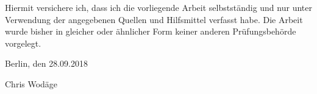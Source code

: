 
Hiermit versichere ich, dass ich die vorliegende Arbeit selbstständig und nur unter
Verwendung der angegebenen Quellen und Hilfsmittel verfasst habe. Die Arbeit wurde bisher
in gleicher oder ähnlicher Form keiner anderen Prüfungsbehörde vorgelegt.

\vskip 1cm

Berlin, den 28.09.2018

\vskip 1.5cm

Chris Wodäge
